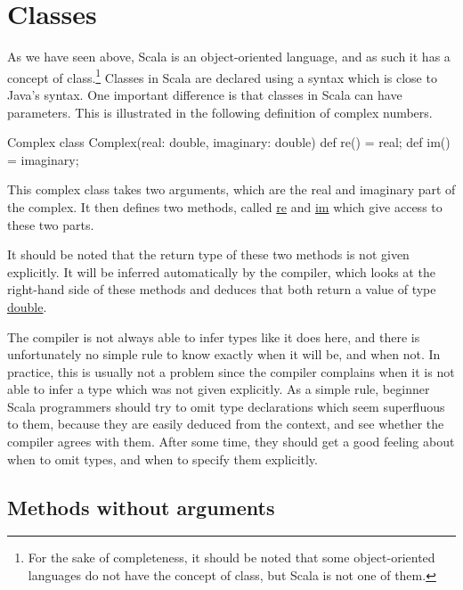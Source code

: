 \documentclass[a4paper,12pt]{article}
\newcommand{\langname}[1]{#1\xspace}
\newcommand{\Scala}{\langname{Scala}}
\newcommand{\Java}{\langname{Java}}
\newcommand{\ident}[1]{\url{#1}\xspace}
\begin{document}

\section{Classes}
\label{sec:classes}

As we have seen above, \Scala is an object-oriented language, and as
such it has a concept of class.\footnote{For the sake of completeness,
  it should be noted that some object-oriented languages do not have
  the concept of class, but \Scala is not one of them.}
Classes in \Scala are declared using a syntax which is close to
\Java's syntax. One important difference is that classes in \Scala can
have parameters. This is illustrated in the following definition of
complex numbers.
\begin{scalaprogram}{Complex}
class Complex(real: double, imaginary: double) {
  def re() = real;
  def im() = imaginary;
}
\end{scalaprogram}
This complex class takes two arguments, which are the real and
imaginary part of the complex. It then defines two methods, called
\ident{re} and \ident{im} which give access to these two parts.

It should be noted that the return type of these two methods is not
given explicitly. It will be inferred automatically by the compiler,
which looks at the right-hand side of these methods and deduces that
both return a value of type \ident{double}.

The compiler is not always able to infer types like it does here, and
there is unfortunately no simple rule to know exactly when it will be,
and when not. In practice, this is usually not a problem since the
compiler complains when it is not able to infer a type which was not
given explicitly. As a simple rule, beginner \Scala programmers
should try to omit type declarations which seem superfluous to them,
because they are easily deduced from the context, and see whether the
compiler agrees with them. After some time, they should get a good
feeling about when to omit types, and when to specify them
explicitly.

\subsection{Methods without arguments}
\label{sec:meth-wo-args}
\end{document}
